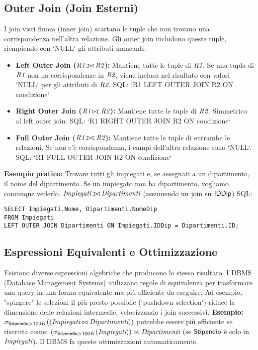 	\subsection{Outer Join (Join Esterni)}
	I join visti finora (inner join) scartano le tuple che non trovano una corrispondenza nell'altra relazione. Gli outer join includono queste tuple, riempiendo con `NULL` gli attributi mancanti.
	\begin{itemize}
		\item \textbf{Left Outer Join ($\Rel{R1} \myleftouterjoin \Rel{R2}$):} Mantiene tutte le tuple di $\textit{R1}$. Se una tupla di $\textit{R1}$ non ha corrispondenze in $\textit{R2}$, viene inclusa nel risultato con valori `NULL` per gli attributi di $\textit{R2}$.
		SQL: `R1 LEFT OUTER JOIN R2 ON condizione`
		\item \textbf{Right Outer Join ($\Rel{R1} \myrightouterjoin \Rel{R2}$):} Mantiene tutte le tuple di $\textit{R2}$. Simmetrico al left outer join.
		SQL: `R1 RIGHT OUTER JOIN R2 ON condizione`
		\item \textbf{Full Outer Join ($\Rel{R1} \myfullouterjoin \Rel{R2}$):} Mantiene tutte le tuple di entrambe le relazioni. Se non c'è corrispondenza, i campi dell'altra relazione sono `NULL`.
		SQL: `R1 FULL OUTER JOIN R2 ON condizione`
	\end{itemize}
	\textbf{Esempio pratico:} Trovare tutti gli impiegati e, se assegnati a un dipartimento, il nome del dipartimento. Se un impiegato non ha dipartimento, vogliamo comunque vederlo.
	$\Rel{Impiegati} \myleftouterjoin \Rel{Dipartimenti}$ (assumendo un join su $\textsf{IDDip}$)
	SQL:
	\begin{verbatim}
SELECT Impiegati.Nome, Dipartimenti.NomeDip
FROM Impiegati
LEFT OUTER JOIN Dipartimenti ON Impiegati.IDDip = Dipartimenti.ID;
	\end{verbatim}
	
	\subsection{Espressioni Equivalenti e Ottimizzazione}
	Esistono diverse espressioni algebriche che producono lo stesso risultato. I DBMS (Database Management Systems) utilizzano regole di equivalenza per trasformare una query in una forma equivalente ma più efficiente da eseguire.
	Ad esempio, "spingere" le selezioni il più presto possibile (`pushdown selection`) riduce la dimensione delle relazioni intermedie, velocizzando i join successivi.
	\textbf{Esempio:}
	$\sigma_{\textsf{Stipendio}>100K}((\textit{Impiegati} \bowtie \textit{Dipartimenti}))$
	potrebbe essere più efficiente se riscritta come:
	$(\sigma_{\textsf{Stipendio}>100K}(\textit{Impiegati})) \bowtie \textit{Dipartimenti}$
	(se $\textsf{Stipendio}$ è solo in $\textit{Impiegati}$). Il DBMS fa queste ottimizzazioni automaticamente.
	
